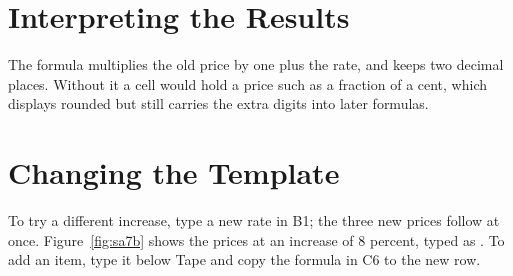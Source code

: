 \section{Interpreting the Results}
The formula multiplies the old price by one plus the rate, and
 keeps two decimal places.  Without it a cell would hold a price
such as a fraction of a cent, which displays rounded but still carries the
extra digits into later formulas.

\section{Changing the Template}
To try a different increase, type a new rate in B1; the three new prices
follow at once.  Figure~\ref{fig:sa7b} shows the prices at an increase of
8 percent, typed as .
  To add an item, type it below Tape and copy the formula in
C6 to the new row.
